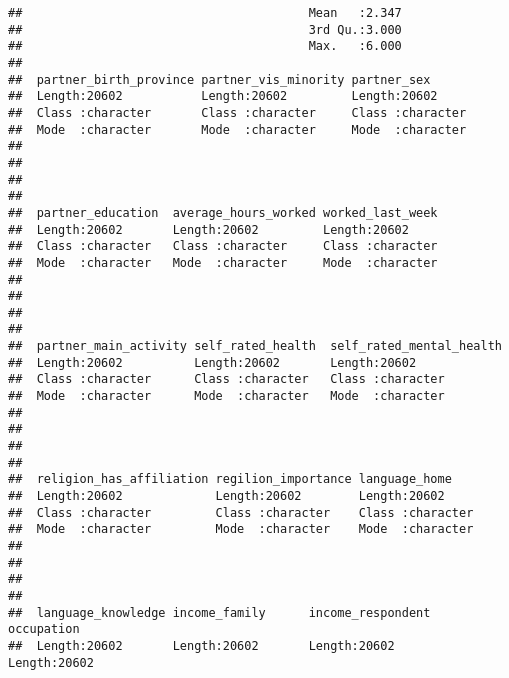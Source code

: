 \documentclass[
]{article}
\begin{document}
\begin{verbatim}
##                                        Mean   :2.347                        
##                                        3rd Qu.:3.000                        
##                                        Max.   :6.000                        
##                                                                             
##  partner_birth_province partner_vis_minority partner_sex       
##  Length:20602           Length:20602         Length:20602      
##  Class :character       Class :character     Class :character  
##  Mode  :character       Mode  :character     Mode  :character  
##                                                                
##                                                                
##                                                                
##                                                                
##  partner_education  average_hours_worked worked_last_week  
##  Length:20602       Length:20602         Length:20602      
##  Class :character   Class :character     Class :character  
##  Mode  :character   Mode  :character     Mode  :character  
##                                                            
##                                                            
##                                                            
##                                                            
##  partner_main_activity self_rated_health  self_rated_mental_health
##  Length:20602          Length:20602       Length:20602            
##  Class :character      Class :character   Class :character        
##  Mode  :character      Mode  :character   Mode  :character        
##                                                                   
##                                                                   
##                                                                   
##                                                                   
##  religion_has_affiliation regilion_importance language_home     
##  Length:20602             Length:20602        Length:20602      
##  Class :character         Class :character    Class :character  
##  Mode  :character         Mode  :character    Mode  :character  
##                                                                 
##                                                                 
##                                                                 
##                                                                 
##  language_knowledge income_family      income_respondent   occupation       
##  Length:20602       Length:20602       Length:20602       Length:20602      

\end{verbatim}
\end{document}
